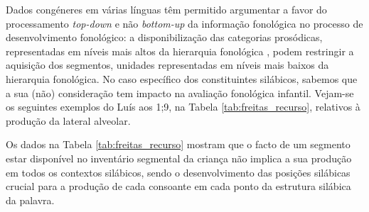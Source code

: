\documentclass[output=paper]{LSP/langsci}
\begin{document}
Dados congéneres em várias línguas têm permitido argumentar a favor do processamento \textit{top-down} e não \textit{bottom-up} da informação fonológica no processo de desenvolvimento fonológico: a disponibilização das categorias prosódicas, representadas em níveis mais altos da hierarquia fonológica \citep{nesporvogel1986}, podem restringir a aquisição dos segmentos, unidades representadas em níveis mais baixos da hierarquia fonológica. No caso específico dos constituintes silábicos, sabemos que a sua (não) consideração tem impacto na avaliação fonológica infantil. Vejam-se os seguintes exemplos do Luís aos 1;9, na Tabela \ref{tab:freitas_recurso}, relativos à produção da lateral alveolar.
\begin{table}
  \caption{Avaliação com/sem recurso aos constituintes silábicos (Luís: 1;09)}
  \label{tab:freitas_recurso}
\end{table}

Os dados na Tabela \ref{tab:freitas_recurso} mostram que o facto de um segmento estar disponível no inventário segmental da criança não implica a sua produção em todos os contextos silábicos, sendo o desenvolvimento das posições silábicas crucial para a produção de cada consoante em cada ponto da estrutura silábica da palavra. 
\end{document}
